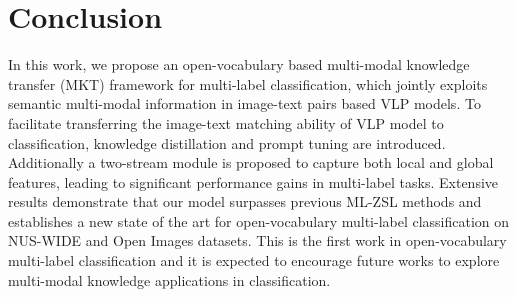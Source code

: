 \section{Conclusion}
In this work, we propose an open-vocabulary based multi-modal knowledge transfer (MKT) framework for multi-label classification, which jointly exploits semantic multi-modal information in image-text pairs based VLP models.
To facilitate transferring the image-text matching ability of VLP model to classification, knowledge distillation and prompt tuning are introduced.
Additionally a two-stream module is proposed to capture both local and global features, leading to significant performance gains in multi-label tasks.
Extensive results demonstrate that our model surpasses previous ML-ZSL methods and establishes a new state of the art for open-vocabulary multi-label classification on NUS-WIDE and Open Images datasets.
This is the first work in open-vocabulary multi-label classification and it is expected to encourage future works to explore multi-modal knowledge applications in classification.